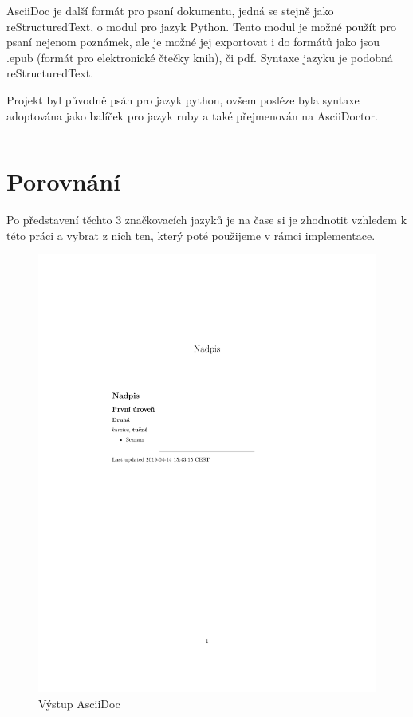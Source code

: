 AsciiDoc je další formát pro psaní dokumentu, jedná se stejně jako reStructuredText, o modul pro jazyk Python. Tento modul je možné použít pro psaní nejenom poznámek,
ale je možné jej exportovat i do formátů jako jsou .epub (formát pro elektronické čtečky knih), či \gls{pdf}. \cite{asciiDoc} Syntaxe jazyku je podobná reStructuredText.

Projekt byl původně psán pro jazyk python, ovšem posléze byla syntaxe adoptována jako balíček pro jazyk ruby a také přejmenován na AsciiDoctor.

\inputminted{text}{example-ascii.adoc}

\section{Porovnání}

Po představení těchto 3 značkovacích jazyků je na čase si je zhodnotit vzhledem k této práci a vybrat z nich ten, který poté použijeme v rámci implementace.

\begin{figure}[h]
    \centering
    \includegraphics[width=\textwidth]{example-ascii.pdf}
    \caption{Výstup AsciiDoc}
    \label{fig:asciiOutput}
\end{figure}
